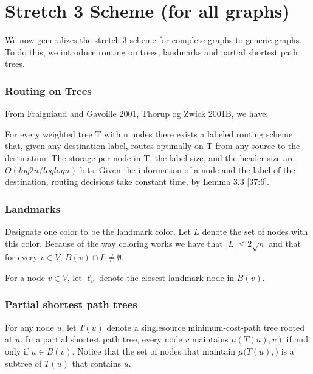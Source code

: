 \chapter{Stretch 3 Scheme (for all graphs)}
We now generalizes the stretch 3 scheme for complete graphs to generic graphs. To do this, we introduce routing on trees, landmarks and partial shortest path trees.

\subsection{Routing on Trees}
From Fraigniaud and Gavoille 2001, Thorup og Zwick 2001B, we have: %

For every weighted tree T with n nodes there exists a labeled routing scheme that, given any destination label, routes optimally on T from any source to the destination. The storage per node in T, the label size, and the header size are $O(log2 n/ log log n)$ bits. Given the information of a node and the label of the destination, routing decisions take constant time, by Lemma 3.3 \cite{compactNameIndepRouting}[37:6].

\subsection{Landmarks}
Designate one color to be the landmark color. Let $L$ denote the set of nodes with this color. Because of the way coloring works we have that $|L| \leq 2 \sqrt{n}$ and that for every $v\in V$, $B(v)\cap L \neq \emptyset$.

For a node $v\in V$, let $\ell_v$ denote the closest landmark node in $B(v)$.

\subsection{Partial shortest path trees}
For any node $u$, let $T(u)$ denote a singlesource minimum-cost-path tree rooted at $u$. In a partial shortest path tree, every node $v$ maintains $\mu(T(u),v)$ if and only if $u \in B(v)$. Notice that the set of nodes that maintain $\mu(T(u),\dot)$ is a subtree of $T(u)$ that contains $u$.\\


